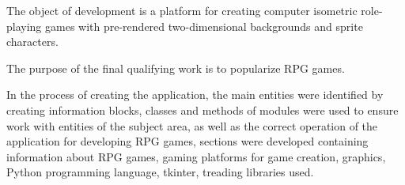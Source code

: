 The object of development is a platform for creating computer isometric role-playing games with pre-rendered two-dimensional backgrounds and sprite characters.

The purpose of the final qualifying work is to popularize RPG games.

In the process of creating the application, the main entities were identified by creating information blocks, classes and methods of modules were used to ensure work with entities of the subject area, as well as the correct operation of the application for developing RPG games, sections were developed containing information about RPG games, gaming platforms for game creation, graphics, Python programming language, tkinter, treading libraries used.

